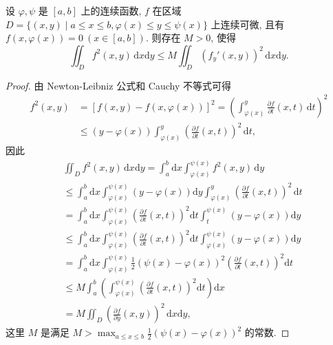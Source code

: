 \documentclass[../../main.tex]{subfiles}%
\begin{document}
\begin{theorem}\label{theorem:Poincaré(庞加莱)不等式}
设 \(\varphi, \psi\) 是 \([a,b]\) 上的连续函数, \(f\) 在区域 \(D = \{(x,y) \mid a \leqslant x \leqslant b, \varphi(x) \leqslant y \leqslant \psi(x)\}\) 上连续可微, 且有 \(f(x, \varphi(x)) = 0\ (x \in [a,b])\). 则存在 \(M > 0\), 使得
\[
\iint_D f^2(x,y) \, \mathrm{d}x\mathrm{d}y \leqslant M \iint_D (f_y'(x,y))^2 \, \mathrm{d}x\mathrm{d}y.
\]
\end{theorem}
\begin{proof}
由 Newton-Leibniz 公式和 Cauchy 不等式可得
\begin{align*}
f^2(x,y)&=[f(x,y)-f(x,\varphi (x))]^2=\left( \int_{\varphi (x)}^y{\frac{\partial f}{\partial t}(x,t)\,\mathrm{d}t} \right) ^2
\\
&\leqslant (y-\varphi (x))\int_{\varphi (x)}^y{\left( \frac{\partial f}{\partial t}(x,t) \right) ^2\,\mathrm{d}t},
\end{align*}
因此
\begin{align*}
&\iint_D{f^2\left( x,y \right) \,\mathrm{d}x\mathrm{d}y}=\int_a^b{\mathrm{d}x}\int_{\varphi \left( x \right)}^{\psi \left( x \right)}{f^2\left( x,y \right) \,\mathrm{d}y}
\\
&\leqslant \int_a^b{\mathrm{d}x}\int_{\varphi \left( x \right)}^{\psi \left( x \right)}{\left( y-\varphi \left( x \right) \right) \mathrm{d}y}\int_{\varphi \left( x \right)}^y{\left( \frac{\partial f}{\partial t}\left( x,t \right) \right) ^2\,\mathrm{d}t}
\\
&=\int_a^b{\mathrm{d}x}\int_{\varphi \left( x \right)}^{\psi \left( x \right)}{\left( \frac{\partial f}{\partial t}\left( x,t \right) \right) ^2\mathrm{d}t}\int_t^{\psi \left( x \right)}{\left( y-\varphi \left( x \right) \right) \mathrm{d}y}
\\
&\leqslant \int_a^b{\mathrm{d}x}\int_{\varphi \left( x \right)}^{\psi \left( x \right)}{\left( \frac{\partial f}{\partial t}\left( x,t \right) \right) ^2\mathrm{d}t}\int_{\varphi \left( x \right)}^{\psi \left( x \right)}{\left( y-\varphi \left( x \right) \right) \mathrm{d}y}
\\
&=\int_a^b{\mathrm{d}x}\int_{\varphi \left( x \right)}^{\psi \left( x \right)}{\frac{1}{2}\left( \psi \left( x \right) -\varphi \left( x \right) \right) ^2\left( \frac{\partial f}{\partial t}\left( x,t \right) \right) ^2\mathrm{d}t}
\\
&\leqslant M\int_a^b{\left( \int_{\varphi \left( x \right)}^{\psi \left( x \right)}{\left( \frac{\partial f}{\partial t}\left( x,t \right) \right) ^2\mathrm{d}t} \right) \mathrm{d}x}
\\
&=M\iint_D{\left( \frac{\partial f}{\partial y}\left( x,y \right) \right) ^2\,\mathrm{d}x\mathrm{d}y},
\end{align*}
这里 \(M\) 是满足 \(M > \max_{a \leqslant x \leqslant b} \frac{1}{2} (\psi(x) - \varphi(x))^2\) 的常数.
\end{proof}
\end{document}
